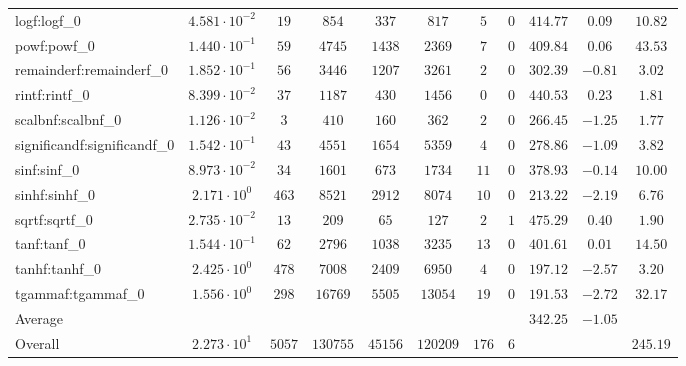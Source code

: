 \begin{tabular}{|l|c|c|c|c|c|c|c|c|c|c|}
logf:logf\_0                 & $ 4.581 \cdot 10^{-2} $ & $ 19     $ & $ 854    $ & $ 337   $ & $ 817    $ & $ 5   $ & $ 0 $ & $ 414.77      $ & $ 0.09    $ & $ 10.82   $ \\
powf:powf\_0                 & $ 1.440 \cdot 10^{-1} $ & $ 59     $ & $ 4745   $ & $ 1438  $ & $ 2369   $ & $ 7   $ & $ 0 $ & $ 409.84      $ & $ 0.06    $ & $ 43.53   $ \\
remainderf:remainderf\_0     & $ 1.852 \cdot 10^{-1} $ & $ 56     $ & $ 3446   $ & $ 1207  $ & $ 3261   $ & $ 2   $ & $ 0 $ & $ 302.39      $ & $ -0.81   $ & $ 3.02    $ \\
rintf:rintf\_0               & $ 8.399 \cdot 10^{-2} $ & $ 37     $ & $ 1187   $ & $ 430   $ & $ 1456   $ & $ 0   $ & $ 0 $ & $ 440.53      $ & $ 0.23    $ & $ 1.81    $ \\
scalbnf:scalbnf\_0           & $ 1.126 \cdot 10^{-2} $ & $ 3      $ & $ 410    $ & $ 160   $ & $ 362    $ & $ 2   $ & $ 0 $ & $ 266.45      $ & $ -1.25   $ & $ 1.77    $ \\
significandf:significandf\_0 & $ 1.542 \cdot 10^{-1} $ & $ 43     $ & $ 4551   $ & $ 1654  $ & $ 5359   $ & $ 4   $ & $ 0 $ & $ 278.86      $ & $ -1.09   $ & $ 3.82    $ \\
sinf:sinf\_0                 & $ 8.973 \cdot 10^{-2} $ & $ 34     $ & $ 1601   $ & $ 673   $ & $ 1734   $ & $ 11  $ & $ 0 $ & $ 378.93      $ & $ -0.14   $ & $ 10.00   $ \\
sinhf:sinhf\_0               & $ 2.171 \cdot 10^{0}  $ & $ 463    $ & $ 8521   $ & $ 2912  $ & $ 8074   $ & $ 10  $ & $ 0 $ & $ 213.22      $ & $ -2.19   $ & $ 6.76    $ \\
sqrtf:sqrtf\_0               & $ 2.735 \cdot 10^{-2} $ & $ 13     $ & $ 209    $ & $ 65    $ & $ 127    $ & $ 2   $ & $ 1 $ & $ 475.29      $ & $ 0.40    $ & $ 1.90    $ \\
tanf:tanf\_0                 & $ 1.544 \cdot 10^{-1} $ & $ 62     $ & $ 2796   $ & $ 1038  $ & $ 3235   $ & $ 13  $ & $ 0 $ & $ 401.61      $ & $ 0.01    $ & $ 14.50   $ \\
tanhf:tanhf\_0               & $ 2.425 \cdot 10^{0}  $ & $ 478    $ & $ 7008   $ & $ 2409  $ & $ 6950   $ & $ 4   $ & $ 0 $ & $ 197.12      $ & $ -2.57   $ & $ 3.20    $ \\
tgammaf:tgammaf\_0           & $ 1.556 \cdot 10^{0}  $ & $ 298    $ & $ 16769  $ & $ 5505  $ & $ 13054  $ & $ 19  $ & $ 0 $ & $ 191.53      $ & $ -2.72   $ & $ 32.17   $ \\
\hline
Average                      & $                     $ & $        $ & $        $ & $       $ & $        $ & $     $ & $   $ & $ 342.25      $ & $ -1.05   $ & $         $ \\
\hline
Overall                      & $ 2.273 \cdot 10^{1}  $ & $ 5057   $ & $ 130755 $ & $ 45156 $ & $ 120209 $ & $ 176 $ & $ 6 $ & $             $ & $         $ & $ 245.19  $ \\
\hline
\end{tabular}
